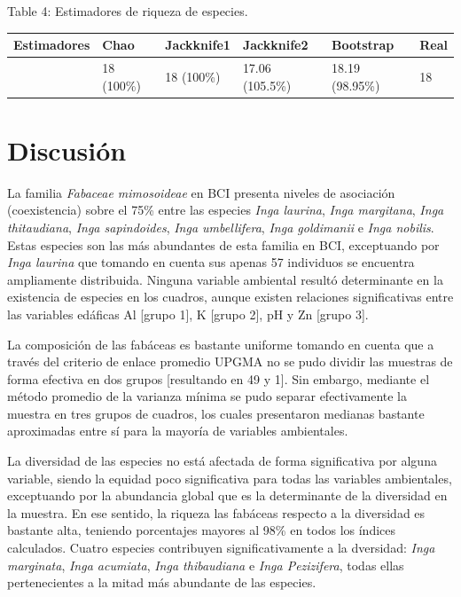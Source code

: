 \documentclass[11pt,]{article}
\begin{document}
Table 4: Estimadores de riqueza de especies. \label{tab:est}

\begin{longtable}[]{@{}llllll@{}}
\toprule
Estimadores & Chao & Jackknife1 & Jackknife2 & Bootstrap &
Real\tabularnewline
\midrule
\endhead
& 18 (100\%) & 18 (100\%) & 17.06 (105.5\%) & 18.19 (98.95\%) &
18\tabularnewline
\bottomrule
\end{longtable}

\section{Discusión}\label{discusiuxf3n}

La familia \emph{Fabaceae mimosoideae} en BCI presenta niveles de
asociación (coexistencia) sobre el 75\% entre las especies \emph{Inga
laurina}, \emph{Inga margitana}, \emph{Inga thitaudiana}, \emph{Inga
sapindoides}, \emph{Inga umbellifera}, \emph{Inga goldimanii} e
\emph{Inga nobilis}. Estas especies son las más abundantes de esta
familia en BCI, exceptuando por \emph{Inga laurina} que tomando en
cuenta sus apenas 57 individuos se encuentra ampliamente distribuida.
Ninguna variable ambiental resultó determinante en la existencia de
especies en los cuadros, aunque existen relaciones significativas entre
las variables edáficas Al {[}grupo 1{]}, K {[}grupo 2{]}, pH y Zn
{[}grupo 3{]}.

La composición de las fabáceas es bastante uniforme tomando en cuenta
que a través del criterio de enlace promedio UPGMA no se pudo dividir
las muestras de forma efectiva en dos grupos {[}resultando en 49 y 1{]}.
Sin embargo, mediante el método promedio de la varianza mínima se pudo
separar efectivamente la muestra en tres grupos de cuadros, los cuales
presentaron medianas bastante aproximadas entre sí para la mayoría de
variables ambientales.

La diversidad de las especies no está afectada de forma significativa
por alguna variable, siendo la equidad poco significativa para todas las
variables ambientales, exceptuando por la abundancia global que es la
determinante de la diversidad en la muestra. En ese sentido, la riqueza
las fabáceas respecto a la diversidad es bastante alta, teniendo
porcentajes mayores al 98\% en todos los índices calculados. Cuatro
especies contribuyen significativamente a la dversidad: \emph{Inga
marginata}, \emph{Inga acumiata}, \emph{Inga thibaudiana} e \emph{Inga
Pezizifera}, todas ellas pertenecientes a la mitad más abundante de las
especies.
\end{document}
